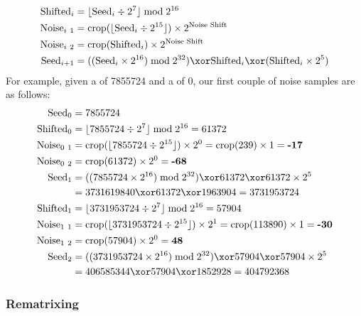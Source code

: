 \begin{align*}
\text{Shifted}_i &= \lfloor\text{Seed}_i \div 2 ^ 7\rfloor \bmod{2 ^ {16}} \\
\text{Noise}_{i~1} &= \text{crop}(\lfloor\text{Seed}_i \div 2 ^ {15}\rfloor) \times 2 ^ {\text{Noise Shift}} \\
\text{Noise}_{i~2} &= \text{crop}(\text{Shifted}_i) \times 2 ^ {\text{Noise Shift}} \\
\text{Seed}_{i + 1} &= ((\text{Seed}_i \times 2 ^ {16}) \bmod{2 ^ {32}}) \xor \text{Shifted}_i \xor (\text{Shifted}_i \times 2 ^ 5)
\end{align*}
For example, given a  of 7855724 and a
 of 0, our first couple of noise samples are
as follows:
\begin{align*}
\text{Seed}_0 &= 7855724 \\
\text{Shifted}_0 &= \lfloor 7855724 \div 2 ^ 7\rfloor \bmod{2 ^ {16}} = 61372 \\
\text{Noise}_{0~1} &= \text{crop}(\lfloor 7855724 \div 2 ^ {15}\rfloor) \times 2 ^ 0 = \text{crop}(239) \times 1 = \textbf{-17} \\
\text{Noise}_{0~2} &= \text{crop}(61372) \times 2 ^ 0 = \textbf{-68} \\
\text{Seed}_1 &= ((7855724 \times 2 ^ {16}) \bmod{2 ^ {32}}) \xor 61372 \xor 61372 \times 2 ^ 5 \\
&= 3731619840 \xor 61372 \xor 1963904 = 3731953724 \\
\text{Shifted}_1 &= \lfloor 3731953724 \div 2 ^ 7 \rfloor \bmod{2 ^ {16}} = 57904 \\
\text{Noise}_{1~1} &= \text{crop}(\lfloor 3731953724 \div 2 ^ {15}\rfloor) \times 2 ^ 1 = \text{crop}(113890) \times 1 = \textbf{-30} \\
\text{Noise}_{1~2} &= \text{crop}(57904) \times 2 ^ 0 = \textbf{48} \\
\text{Seed}_2 &= ((3731953724 \times 2 ^ {16}) \bmod{2 ^ {32}}) \xor 57904 \xor 57904 \times 2 ^ 5 \\
&= 406585344 \xor 57904 \xor 1852928 = 404792368
\end{align*}

\clearpage

\subsubsection{Rematrixing}

